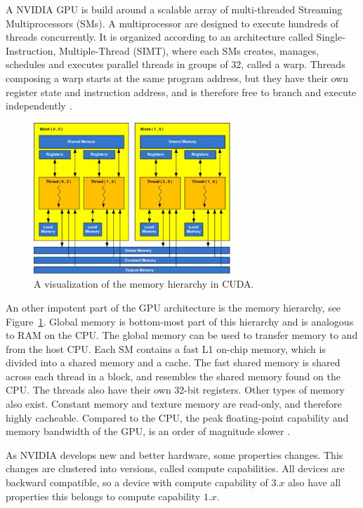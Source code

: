 A NVIDIA GPU is build around a scalable array of multi-threaded Streaming Multiprocessors (SMs). A multiprocessor are designed to execute hundreds of threads concurrently. It is organized according to an architecture called Single-Instruction, Multiple-Thread (SIMT), where each SMs creates, manages, schedules and executes parallel threads in groups of 32, called a warp. Threads composing a warp starts at the same program address, but they have their own register state and instruction address, and is therefore free to branch and execute independently \citep{cuda_programming_guide}.

\begin{figure}[ht!]
\centering
\includegraphics[width=75mm]{../gfx/memory_hierarchy.png}
\caption{A visualization of the memory hierarchy in CUDA.}
\label{fig:memory_hierachy}
\end{figure}

An other impotent part of the GPU architecture is the memory hierarchy, see Figure~\ref{fig:memory_hierachy}. Global memory is bottom-most part of this hierarchy and is analogous to RAM on the CPU\@. The global memory can be used to transfer memory to and from the host CPU\@. Each SM contains a fast L1 on-chip memory, which is divided into a shared memory and a cache. The fast shared memory is shared across each thread in a block, and resembles the shared memory found on the CPU\@. The threads also have their own 32-bit registers. Other types of memory also exist. Constant memory and texture memory are read-only, and therefore highly cacheable. Compared to the CPU, the peak floating-point capability and memory bandwidth of the GPU, is an order of magnitude slower \citep{Liangcu}.

As NVIDIA develops new and better hardware, some properties changes. This changes are clustered into versions, called compute capabilities. All devices are backward compatible, so a device with compute capability of $3.x$ also have all properties this belongs to compute capability $1.x$.  


